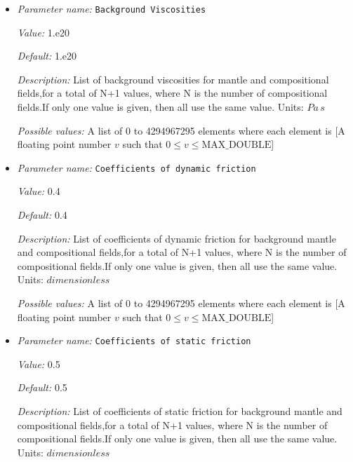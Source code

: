 \begin{itemize}
\item {\it Parameter name:} {\tt Background Viscosities}
\label{parameters:Material model/Dynamic Friction/Viscosities/Background Viscosities}


{\it Value:} 1.e20


{\it Default:} 1.e20


{\it Description:} List of background viscosities for mantle and compositional fields,for a total of N+1 values, where N is the number of compositional fields.If only one value is given, then all use the same value. Units: $Pa \, s $


{\it Possible values:} A list of 0 to 4294967295 elements where each element is [A floating point number $v$ such that $0 \leq v \leq \text{MAX\_DOUBLE}$]
\item {\it Parameter name:} {\tt Coefficients of dynamic friction}
\label{parameters:Material model/Dynamic Friction/Viscosities/Coefficients of dynamic friction}


{\it Value:} 0.4


{\it Default:} 0.4


{\it Description:} List of coefficients of dynamic friction for background mantle and compositional fields,for a total of N+1 values, where N is the number of compositional fields.If only one value is given, then all use the same value. Units: $dimensionless$


{\it Possible values:} A list of 0 to 4294967295 elements where each element is [A floating point number $v$ such that $0 \leq v \leq \text{MAX\_DOUBLE}$]
\item {\it Parameter name:} {\tt Coefficients of static friction}
\label{parameters:Material model/Dynamic Friction/Viscosities/Coefficients of static friction}


{\it Value:} 0.5


{\it Default:} 0.5


{\it Description:} List of coefficients of static friction for background mantle and compositional fields,for a total of N+1 values, where N is the number of compositional fields.If only one value is given, then all use the same value. Units: $dimensionless$



\end{itemize}
